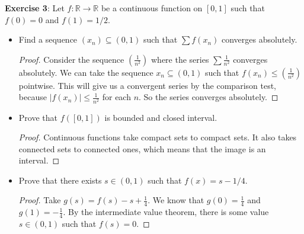 \documentclass{article}
\begin{document}
\textbf{Exercise 3}: Let $f : \mathbb{R} \rightarrow \mathbb{R}$ be a continuous function on $[0, 1]$ such that  $f(0) = 0$ and $f(1) = 1/2$.
    \begin{itemize}
        \item Find a sequence $(x_{n}) \subseteq (0, 1)$ such that $\sum f(x_{n})$ converges absolutely.
            \begin{proof}
                Consider the sequence $(\frac{1}{n^{2}})$ where the series $\sum\frac{1}{n^{2}}$ converges absolutely. We can take the sequence $x_{n} \subseteq (0,1 )$ such that $f(x_{n})  \leq (\frac{1}{n^{2}})$ pointwise. This will give us a convergent series by the comparison test, because $\lvert f(x_{n}) \rvert \leq\frac{1}{n^{2}}$ for each $n$. So the series converges absolutely. 
            \end{proof}

        \item Prove that $f([0, 1])$ is bounded and closed interval.
            \begin{proof}
                Continuous functions take compact sets to compact sets. It also takes connected sets to connected ones, which means that the image is an interval.
            \end{proof}

        \item Prove that there exists $s \in (0, 1)$ such that $f(x) = s - 1/4$.
            \begin{proof}
                Take $g(s) = f(s) - s + \frac{1}{4}$. We know that $g(0) = \frac{1}{4}$ and $g(1) = -\frac{1}{4}$. By the intermediate value theorem, there is some value $s \in (0, 1)$ such that $f(s) = 0$.
            \end{proof}
    \end{itemize}
\end{document}
